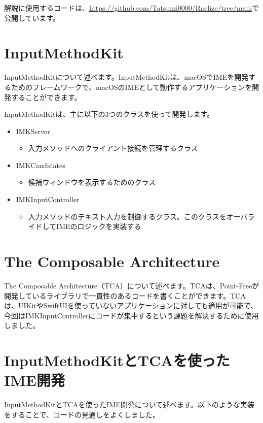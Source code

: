 \documentclass[uplatex,a4j,12pt,twocolumn]{jsarticle}
\begin{document}
解説に使用するコードは、\url{https://github.com/Tatsumi0000/Raelize/tree/main}で公開しています。

\section{InputMethodKit}\label{sec:abount_inputmethodkit}
InputMethodKitについて述べます。InputMethodKitは、macOSでIMEを開発するためのフレームワークで、macOSのIMEとして動作するアプリケーションを開発することができます。

InputMethodKitは、主に以下の3つのクラスを使って開発します。
\begin{itemize}
    \item IMKServer
    \begin{itemize}
        \item 入力メソッドへのクライアント接続を管理するクラス\cite{bib:imkserver}
    \end{itemize}
    \item IMKCandidates
    \begin{itemize}
        \item 候補ウィンドウを表示するためのクラス\cite{bib:imk_candidates}
    \end{itemize}
    \item IMKInputController
    \begin{itemize}
        \item 入力メソッドのテキスト入力を制御するクラス\cite{bib:imk_input_controller}。このクラスをオーバライドしてIMEのロジックを実装する
    \end{itemize}
\end{itemize}


\section{The Composable Architecture}\label{sec:the_composable_architecture}
The Composable Architecture（TCA）について述べます。TCAは、Point-Freeが開発しているライブラリで一貫性のあるコードを書くことができます。TCAは、UIKitやSwiftUIを使っていないアプリケーションに対しても適用が可能で、今回はIMKInputControllerにコードが集中するという課題を解決するために使用しました。

\section{InputMethodKitとTCAを使ったIME開発}\label{sec:use_imk_and_tca}
InputMethodKitとTCAを使ったIME開発について述べます。以下のような実装をすることで、コードの見通しをよくしました。
 
\end{document}
